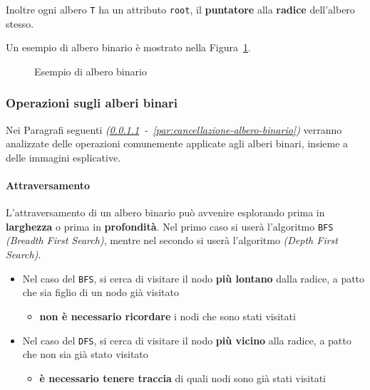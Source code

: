 \documentclass[italian, 10pt]{article}
\begin{document}
Inoltre ogni albero \texttt{T} ha un attributo \texttt{root}, il \textbf{puntatore} alla \textbf{radice} dell'albero stesso.

\bigskip
Un esempio di albero binario è mostrato nella Figura~\ref{fig:esempio-albero-binario}.

\begin{figure}[htbp]
  \bigskip
  \centering
  \caption{Esempio di albero binario}
  \label{fig:esempio-albero-binario}
  \bigskip
\end{figure}

\subsubsection{Operazioni sugli alberi binari}

Nei Paragrafi seguenti \textit{(\ref{attraversamento-albero-binario}~-~\ref{par:cancellazione-albero-binario})} verranno analizzate delle operazioni comunemente applicate agli alberi binari, insieme a delle immagini esplicative.

\paragraph{Attraversamento}
\label{attraversamento-albero-binario}

L'attraversamento di un albero binario può avvenire esplorando prima in \textbf{larghezza} o prima in \textbf{profondità}.
Nel primo caso si userà l'algoritmo \texttt{BFS} \textit{(Breadth First Search)}, mentre nel secondo si userà l'algoritmo \DFS \textit{(Depth First Search)}.

\begin{itemize}
  \item Nel caso del \texttt{BFS}, si cerca di visitare il nodo \textbf{più lontano} dalla radice, a patto che sia figlio di un nodo già visitato
        \begin{itemize}
          \item \textbf{non è necessario ricordare} i nodi che sono stati visitati
        \end{itemize}
  \item Nel caso del \texttt{DFS}, si cerca di visitare il nodo \textbf{più vicino} alla radice, a patto che non sia già stato visitato
        \begin{itemize}
          \item \textbf{è necessario tenere traccia} di quali nodi sono già stati visitati
        \end{itemize}
\end{itemize}
\end{document}
